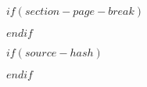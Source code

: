 \usepackage{bold-extra}
\usepackage[perpage,symbol*]{footmisc}
\usepackage[labelformat=empty]{caption}

$if(section-page-break)$
\usepackage{titlesec}
$endif$

$if(source-hash)$
$endif$
